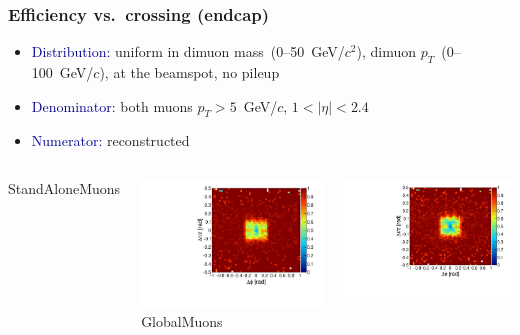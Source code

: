 \documentclass[compress]{beamer}
\begin{document}
\begin{frame}
\frametitle{Efficiency vs.\ crossing (endcap)}
\begin{itemize}
\item \textcolor{darkblue}{Distribution:} uniform in dimuon mass~(0--50~GeV/$c^2$), dimuon $p_T$~(0--100~GeV/$c$), at the beamspot, no pileup

\item \textcolor{darkblue}{Denominator:} both muons $p_T > 5$~GeV/$c$, $1 < |\eta| < 2.4$

\item \textcolor{darkblue}{Numerator:} reconstructed
\end{itemize}

\vfill
\begin{columns}
\centering StandAloneMuons

\includegraphics[width=\linewidth]{endcap_dphidr_StandAloneMuon.pdf}
\centering GlobalMuons

\includegraphics[width=\linewidth]{endcap_dphidr_GlobalMuon.pdf}


\end{columns}
\end{frame}
\end{document}
